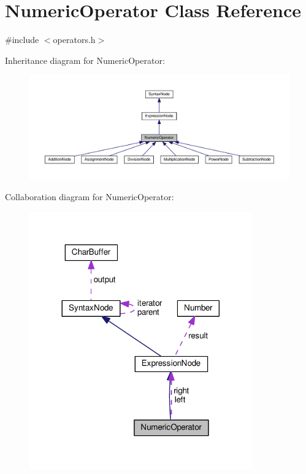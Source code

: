 \hypertarget{classNumericOperator}{}\section{Numeric\+Operator Class Reference}
\label{classNumericOperator}


{\ttfamily \#include $<$operators.\+h$>$}



Inheritance diagram for Numeric\+Operator\+:\nopagebreak
\begin{figure}[H]
\begin{center}
\leavevmode
\includegraphics[width=350pt]{classNumericOperator__inherit__graph}
\end{center}
\end{figure}


Collaboration diagram for Numeric\+Operator\+:\nopagebreak
\begin{figure}[H]
\begin{center}
\leavevmode
\includegraphics[width=272pt]{classNumericOperator__coll__graph}
\end{center}
\end{figure}
